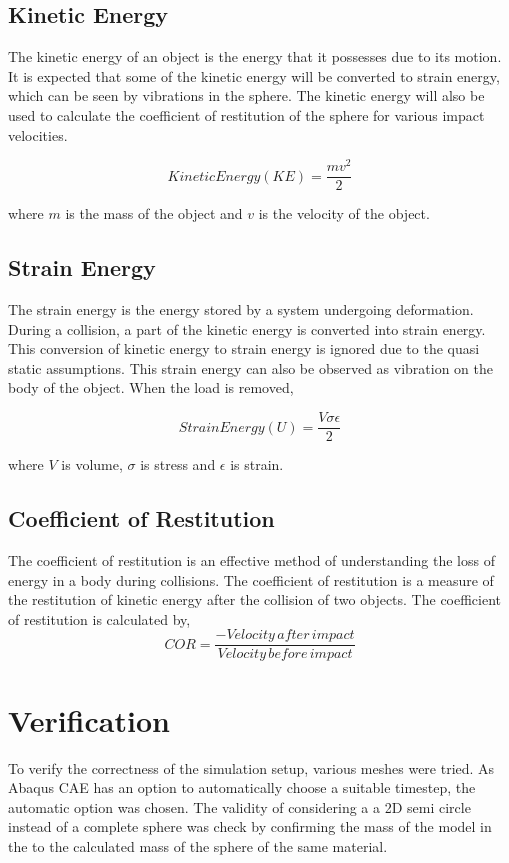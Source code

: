 \subsection{Kinetic Energy}

The kinetic energy of an object is the energy that it possesses due to its motion. It is expected that some of the kinetic energy will be converted to strain energy, which can be seen by vibrations in the sphere. The kinetic energy will also be used to calculate the coefficient of restitution of the sphere for various impact velocities.

\begin{equation}
Kinetic Energy(KE) = \frac{mv^{2}}{2}
\end{equation}
 
where $m$ is the mass of the object and $v$ is the velocity of the object.

\subsection{Strain Energy}

The strain energy is the energy stored by a system undergoing deformation. During a collision, a part of the kinetic energy is converted into strain energy. This conversion of kinetic energy to strain energy is ignored due to the quasi static assumptions. This strain energy can also be observed as vibration on the body of the object. When the load is removed,

\begin{equation}
Strain Energy(U) = \frac{V\sigma\epsilon}{2}
\end{equation}

where $V$ is volume, $\sigma$ is stress and $\epsilon$ is strain.

\subsection{Coefficient of Restitution}

The coefficient of restitution is an effective method of understanding the loss of energy in a body during collisions. The coefficient of restitution is a measure of the restitution of kinetic energy after the collision of two objects. 
The coefficient of restitution is calculated by,
\begin{equation}
COR = \frac{-Velocity\, after\, impact}{Velocity\, before\, impact}
\end{equation}
\section{Verification}

To verify the correctness of the simulation setup, various meshes were tried. 
As Abaqus CAE has an option to automatically choose a suitable timestep, the automatic option was chosen.
The validity of considering a a 2D semi circle instead of a complete sphere was check by confirming the mass of the model in the to the calculated mass of the sphere of the same material.